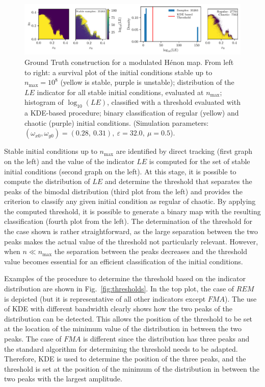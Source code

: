 \begin{figure}[htp]
    \centering
    \includegraphics[width=1.0\textwidth]{6_dynamic_indicators/figs/GT.pdf}
    \caption{Ground Truth construction for a modulated Hénon map. From left to right: a survival plot of the initial conditions stable up to $n_\text{max}=10^8$ (yellow is stable, purple is unstable); distribution of the $LE$ indicator for all stable initial conditions, evaluated at $n_\text{max}$; histogram of $\log_{10}(LE)$, classified with a threshold evaluated with a KDE-based procedure; binary classification of regular (yellow) and chaotic (purple) initial conditions. (Simulation parameters:  $(\omega_{x0},\omega_{y0})= (0.28,\ 0.31),\ \varepsilon=32.0,\ \mu=0.5$).}
    \label{fig:ground_truth_2}
\end{figure}

Stable initial conditions up to $n_\mathrm{max}$ are identified by direct tracking (first graph on the left) and the value of the indicator $LE$ is computed for the set of stable initial conditions (second graph on the left). At this stage, it is possible to compute the distribution of $LE$ and determine the threshold that separates the peaks of the bimodal distribution (third plot from the left) and provides the criterion to classify any given initial condition as regular of chaotic. By applying the computed threshold, it is possible to generate a binary map with the resulting classification (fourth plot from the left). The determination of the threshold for the case shown is rather straightforward, as the large separation between the two peaks makes the actual value of the threshold not particularly relevant. However, when $n \ll n_\mathrm{max}$ the separation between the peaks decreases and the threshold value becomes essential for an efficient classification of the initial conditions. 

Examples of the procedure to determine the threshold based on the indicator distribution are shown in Fig.~\ref{fig:thresholds}. In the top plot, the case of $REM$ is depicted (but it is representative of all other indicators except $FMA$). The use of KDE with different bandwidth clearly shows how the two peaks of the distribution can be detected. This allows the position of the threshold to be set at the location of the minimum value of the distribution in between the two peaks. The case of $FMA$ is different since the distribution has three peaks and the standard algorithm for determining the threshold needs to be adapted. Therefore, KDE is used to determine the position of the three peaks, and the threshold is set at the position of the minimum of the distribution in between the two peaks with the largest amplitude.  

